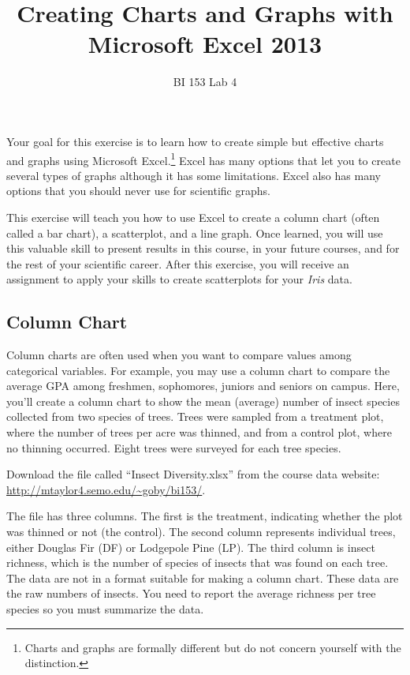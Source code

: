 \documentclass[11pt]{article}
\title{Creating Charts and Graphs with Microsoft Excel 2013}
\author{BI 153 Lab 4}
\date{}                                           %
\newcommand{\VSpace}{\vspace{\baselineskip}}
\begin{document}
\maketitle

Your goal for this exercise is to learn how to create simple but effective charts and graphs using Microsoft Excel.\footnote{Charts and graphs are formally different but do not concern yourself with the distinction.}  Excel has many options that let you to create several types of graphs although it has some limitations. Excel also has many options that you should never use for scientific graphs. 

This exercise will teach you how to use Excel to create a column chart (often called a bar chart), a scatterplot, and a line graph. Once learned, you will use this valuable skill to present results in this course, in your future courses, and for the rest of your scientific career. After this exercise, you will receive an assignment to apply your skills to create scatterplots for your \textit{Iris} data. 

\subsection*{Column Chart}

Column charts are often used when you want to compare values among categorical variables. For example, you may use a column chart to compare the average GPA among freshmen, sophomores, juniors and seniors on campus. Here, you’ll create a column chart to show the mean (average) number of insect species collected from two species of trees. Trees were sampled from a treatment plot, where the number of trees per acre was thinned, and from a control plot, where no thinning occurred. Eight trees were surveyed for each tree species.\VSpace

Download the file called “Insect Diversity.xlsx” from the course data website: \url{http://mtaylor4.semo.edu/~goby/bi153/}.\VSpace

The file has three columns. The first is the treatment, indicating whether the plot was thinned or not (the control). The second column represents individual trees, either Douglas Fir (DF) or Lodgepole Pine (LP). The third column is insect richness, which is the number of species of insects that was found on each tree. The data are not in a format suitable for making a column chart. These data are the raw numbers of insects. You need to report the average richness per tree species so you must summarize the data.
\end{document}
